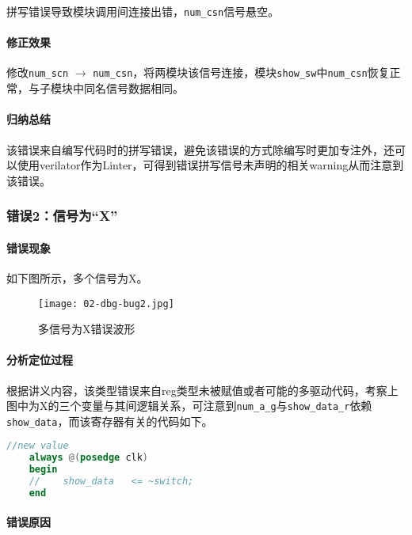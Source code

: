 \documentclass[UTF-8,twoside,c5size]{ctexart}
\begin{document}
	拼写错误导致模块调用间连接出错，\texttt{num\_csn}信号悬空。
	\paragraph{修正效果}\hfill
	
	修改\texttt{num\_scn} $\to$ \texttt{num\_csn}，将两模块该信号连接，模块\texttt{show\_sw}中\texttt{num\_csn}恢复正常，与子模块中同名信号数据相同。
	\paragraph{归纳总结}\hfill
	
	该错误来自编写代码时的拼写错误，避免该错误的方式除编写时更加专注外，还可以使用verilator作为Linter，可得到错误拼写信号未声明的相关warning从而注意到该错误。
	
	\subsubsection{错误2：信号为“X”}
	
	\paragraph{错误现象}\hfill
	
	如下图所示，多个信号为X。
	
	\begin{figure}[!h]
		\centering
		\texttt{[image: 02-dbg-bug2.jpg]}
		\caption{多信号为X错误波形}
	\end{figure}
	
	\paragraph{分析定位过程}\hfill
	
	根据讲义内容，该类型错误来自reg类型未被赋值或者可能的多驱动代码，考察上图中为X的三个变量与其间逻辑关系，可注意到\texttt{num\_a\_g}与\texttt{show\_data\_r}依赖\texttt{show\_data}，而该寄存器有关的代码如下。
	
	\begin{lstlisting}[language=verilog]
	//new value
	always @(posedge clk)
	begin
	//    show_data   <= ~switch;
	end
	\end{lstlisting}

	\paragraph{错误原因}\hfill
	
\end{document}
